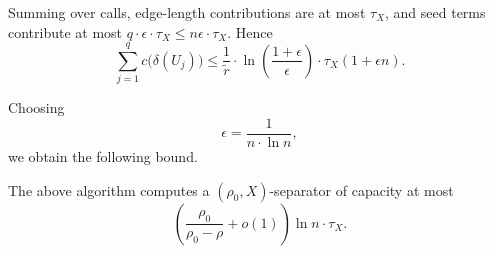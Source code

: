 Summing over calls, edge-length contributions are at most $\tau_X$, and seed terms contribute at most $q\cdot\epsilon\cdot\tau_X\le n\epsilon\cdot\tau_X$. Hence
\[
\sum_{j=1}^q c\bigl(\delta(U_j)\bigr)
\le
\frac{1}{\tilde r}\cdot 
\ln\left(\frac{1+\epsilon}{\epsilon}\right)
\cdot \tau_X(1+\epsilon n).
\]

Choosing
\[
\epsilon=\frac{1}{n\cdot\ln n},
\]
we obtain the following bound.

\begin{theorem}
The above algorithm computes a $(\rho_0,X)$-separator of capacity at most
\[
\left(\frac{\rho_0}{\rho_0-\rho}+o(1)\right)\ln n\cdot \tau_X.
\]
\end{theorem}

